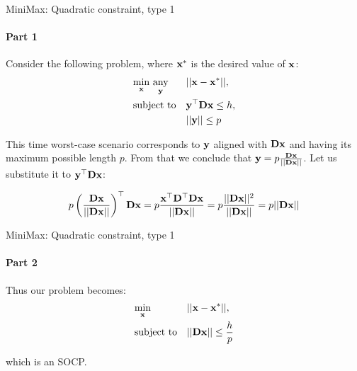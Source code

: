 \documentclass{beamer}
\begin{document}
\begin{frame}{MiniMax: Quadratic constraint, type 1}
\framesubtitle{Part 1}
\begin{flushleft}

Consider the following problem, where $\mathbf{x}^*$ is the desired value of $\mathbf{x}$:
%
\begin{equation}
\begin{aligned}
& \underset{\mathbf{x}}{\text{min}} \ \underset{\mathbf{y}}{\text{any}}
& & ||\mathbf{x} - \mathbf{x}^*||, \\
& \text{subject to}
& & \mathbf{y}^\top \mathbf{D} \mathbf{x} \leq h, \\
& & & ||\mathbf{y}|| \leq p
\end{aligned}
\end{equation}

This time worst-case scenario corresponds to $\mathbf{y}$ aligned with $\mathbf{D} \mathbf{x}$ and having its maximum possible length $p$. From that we conclude that $\mathbf{y} = p \frac{\mathbf{D} \mathbf{x}}{|| \mathbf{D} \mathbf{x} ||} $. Let us substitute it to $\mathbf{y}^\top \mathbf{D} \mathbf{x}$:

\begin{equation}
    p \left( \frac{\mathbf{D} \mathbf{x}}{|| \mathbf{D} \mathbf{x} ||} \right)^\top \mathbf{D} \mathbf{x} =
    p \frac{\mathbf{x}^\top \mathbf{D}^\top \mathbf{D} \mathbf{x}}{|| \mathbf{D} \mathbf{x} ||} = 
    p \frac{|| \mathbf{D} \mathbf{x} ||^2}{|| \mathbf{D} \mathbf{x} ||} = 
    p || \mathbf{D} \mathbf{x} ||
\end{equation}
 
\end{flushleft}
\end{frame}



\begin{frame}{MiniMax: Quadratic constraint, type 1}
\framesubtitle{Part 2}
\begin{flushleft}

Thus our problem becomes:
%
\begin{equation}
\begin{aligned}
& \underset{\mathbf{x}}{\text{min}}
& & ||\mathbf{x} - \mathbf{x}^*||, \\
& \text{subject to}
& & || \mathbf{D} \mathbf{x} || \leq \frac{h}{p}
\end{aligned}
\end{equation}

which is an SOCP.

\end{flushleft}
\end{frame}
\end{document}
